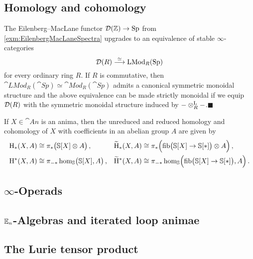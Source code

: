 \subsection{Homology and cohomology}\label{subsec:Homology}
\begin{thm}\label{thm:DRIsModulesOverHR}
	The Eilenberg--MacLane functor $\mathcal{D}(\mathbb{Z})\rightarrow \mathrm{Sp}$ from \cref{exm:EilenbergMacLaneSpectra} upgrades to an equivalence of stable $\infty$-categories
	\begin{equation*}
		\mathcal{D}(R)\overset{\simeq}{\longrightarrow} \mathrm{LMod}_{R}(\mathrm{Sp})
	\end{equation*}
	for every ordinary ring $R$. If $R$ is commutative, then $\cat{LMod}_{R}(\cat{Sp})\simeq \cat{Mod}_R(\cat{Sp})$ admits a canonical symmetric monoidal structure and the above equivalence can be made strictly monoidal if we equip $\mathcal{D}(R)$ with the symmetric monoidal structure induced by $-\otimes^{\mathrm{L}}_R-$.\hfill$\blacksquare$
\end{thm}
\begin{cor}\label{cor:Homology}
	If $X\in\cat{An}$ is an anima, then the unreduced and reduced homology and cohomology of $X$ with coefficients in an abelian group $A$ are given by
	\begin{align*}
		\mathrm{H}_*(X,A)&\cong \pi_*\bigl(\mathbb{S}[X]\otimes A\bigr)\,,& \widetilde{\mathrm{H}}_*(X,A)&\cong \pi_*\Bigl(\operatorname{fib}\bigl(\mathbb{S}[X]\rightarrow \mathbb{S}[*]\bigr)\otimes A\Bigr)\,,\\
		\mathrm{H}^*(X,A)&\cong \pi_{-*}\hom_{\mathbb{S}}\bigl(\mathbb{S}[X], A\bigr)\,,& \widetilde{\mathrm{H}}^*(X,A)&\cong \pi_{-*}\hom_{\mathbb{S}}\Bigl(\operatorname{fib}\bigl(\mathbb{S}[X]\rightarrow \mathbb{S}[*]\bigr), A\Bigr)\,.
	\end{align*}
\end{cor}

\newpage

\subsection{\texorpdfstring{$\infty$}{Infinity}-Operads}\label{subsec:InfinityOperads}

\subsection{\texorpdfstring{$\mathbb{E}_n$}{En}-Algebras and iterated loop animae}\label{subsec:EnAlgebras}

\subsection{The Lurie tensor product}\label{subsec:LurieTensorProduct}